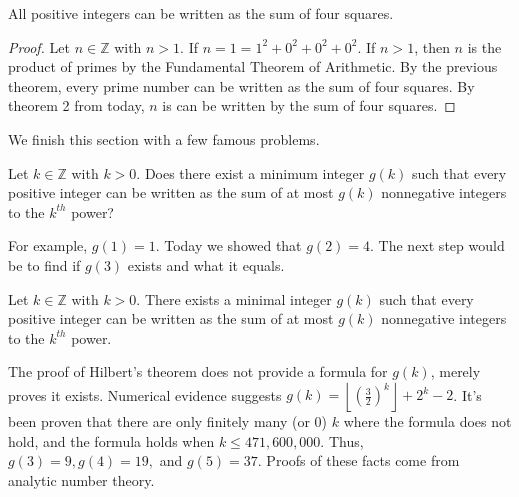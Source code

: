 \documentclass[letterpaper, 11 pt]{article}
\begin{document}
\begin{thm} All positive integers can be written as the sum of four squares.
\end{thm}
\begin{proof}
 Let $n\in\mathbb{Z}$ with $n>1$. If $n=1=1^2+0^2+0^2+0^2$. If $n>1$, then $n$ is the product of primes by the Fundamental Theorem of Arithmetic. By the previous theorem, every prime number can be written as the sum of four squares. By theorem 2 from today, $n$ is can be written by the sum of four squares.
\end{proof}

We finish this section with a few famous problems.
\begin{example}
 Let $k\in\mathbb{Z}$ with $k>0$. Does there exist a minimum integer $g(k)$ such that every positive integer can be written as the sum of at most $g(k)$ nonnegative integers to the $k^{th}$ power?
 \end{example}
 For example, $g(1)= {1}$. Today we showed that $g(2)= {4}$. The next step would be to find if $g(3)$ exists and what it equals.
 
 
\begin{thm}[Hilbert, 1906]
 Let $k\in\mathbb{Z}$ with $k>0$. There exists a minimal integer $g(k)$ such that every positive integer can be written as the sum of at most $g(k)$ nonnegative integers to the $k^{th}$ power.
\end{thm}
The proof of Hilbert's theorem does not provide a formula for $g(k)$, merely proves it exists. Numerical evidence suggests $g(k)=\left\lfloor\left(\frac{3}{2}\right)^k\right\rfloor+2^k-2$. It's been proven that there are only finitely many (or 0) $k$ where the formula does not hold, and the formula holds when $k\leq 471,600,000$. Thus, $g(3)= {9},g(4)=19,$ and $g(5)=37$. Proofs of these facts come from analytic number theory.
\end{document}
